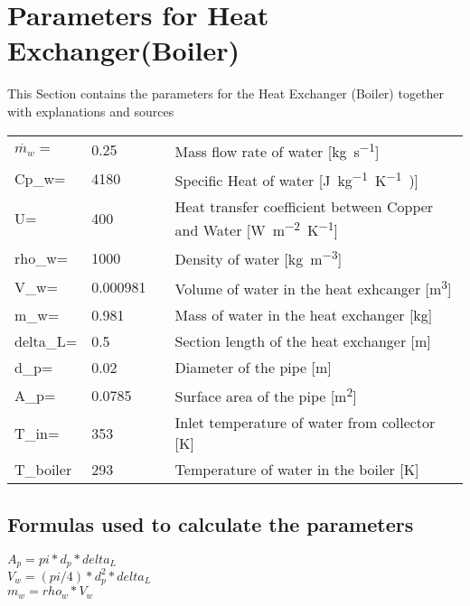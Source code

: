 \section{Parameters for Heat Exchanger(Boiler)} 

This Section contains the parameters for the Heat Exchanger (Boiler) together with explanations and sources 

\begin{tabular}{ l l |c| l} 
	$ \dot{m_{w}}=$		&0.25       &                                          &Mass flow rate of water [\si{kg.s^{-1}}]\\     	
	Cp_{w}=	           	&4180	    &\cite{SpecificHeat}	                   &Specific Heat of water [\si{J.kg^{-1}.K^{-1})}]\\     
	U=		            &400	    &\cite{HeatTransferCoefficient}	           &Heat transfer coefficient between Copper and Water [\si{W.m^{-2}.K^{-1}}] \\
	rho_{w}=	     	&1000	    &\cite{WaterDensity}	                   &Density of water [\si{kg.m^{-3}}] \\
	V_{w}=		        &0.000981	&                                          &Volume of water in the heat exhcanger [\si{m^{3}}]  \\
	m_{w}=	          	&0.981		&                                          &Mass of water in the heat exchanger [\si{kg}]  \\
	delta_L=	    	&0.5		&                                          &Section length of the heat exchanger [\si{m}]  \\
	d_{p}=		        &0.02		&                                          &Diameter of the pipe [\si{m}]  \\
	A_{p}=	         	&0.0785		&                                          &Surface area of the pipe [\si{m^{2}}]  \\
	T_{in}=		        &353	    &                                          &Inlet temperature of water from collector [\si{K}]  \\
	T_{boiler}          &293        &                                          &Temperature of water in the boiler [\si{K}] \\		
\end{tabular}

\subsection{Formulas used to calculate the parameters}

    $ A_{p}=pi*d_{p}*delta_L $ \\
    $ V_{w}=(pi/4)*d_{p}^{2}*delta_L $ \\
    $ m_{w}=rho_{w}* V_{w} $ \\
